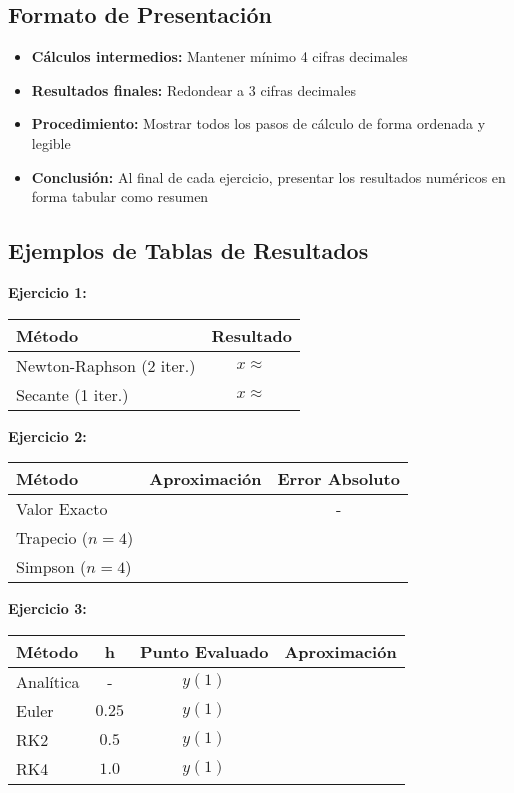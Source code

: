 \documentclass[12pt,a4paper]{article}
\begin{document}
\subsection*{Formato de Presentación}
\begin{itemize}
\item \textbf{Cálculos intermedios:} Mantener mínimo 4 cifras decimales
\item \textbf{Resultados finales:} Redondear a 3 cifras decimales
\item \textbf{Procedimiento:} Mostrar todos los pasos de cálculo de forma ordenada y legible
\item \textbf{Conclusión:} Al final de cada ejercicio, presentar los resultados numéricos en forma tabular como resumen
\end{itemize}

\subsection*{Ejemplos de Tablas de Resultados}

\textbf{Ejercicio 1:}
\begin{center}
\begin{tabular}{|l|c|}
\hline
\textbf{Método} & \textbf{Resultado} \\
\hline
Newton-Raphson (2 iter.) & $x \approx$ \\
\hline
Secante (1 iter.) & $x \approx$ \\
\hline
\end{tabular}
\end{center}

\textbf{Ejercicio 2:}
\begin{center}
\begin{tabular}{|l|c|c|}
\hline
\textbf{Método} & \textbf{Aproximación} & \textbf{Error Absoluto} \\
\hline
Valor Exacto & & - \\
\hline
Trapecio ($n=4$) & & \\
\hline
Simpson ($n=4$) & & \\
\hline
\end{tabular}
\end{center}

\textbf{Ejercicio 3:}
\begin{center}
\begin{tabular}{|l|c|c|c|}
\hline
\textbf{Método} & \textbf{h} & \textbf{Punto Evaluado} & \textbf{Aproximación} \\
\hline
Analítica & - & $y(1)$ & \\
\hline
Euler & $0.25$ & $y(1)$ & \\
\hline
RK2 & $0.5$ & $y(1)$ & \\
\hline
RK4 & $1.0$ & $y(1)$ & \\
\hline
\end{tabular}
\end{center}
\end{document}

